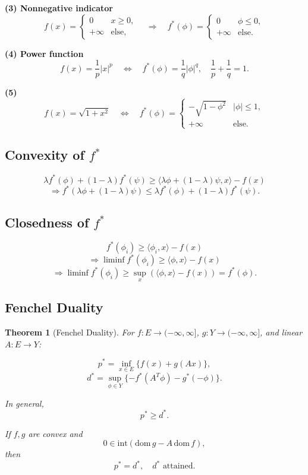 \documentclass[12pt,oneside]{book}
\numberwithin{equation}{section}
\theoremstyle{definition}
\theoremstyle{plain}
\newtheorem{theorem}{Theorem}[section]
\theoremstyle{remark}
\begin{document}
\textbf{(3) Nonnegative indicator}
\[
f(x) =
\begin{cases}
0 & x \ge 0,\\
+\infty & \text{else},
\end{cases}
\quad\Rightarrow\quad
f^*(\phi) =
\begin{cases}
0 & \phi \le 0,\\
+\infty & \text{else}.
\end{cases}
\]

\textbf{(4) Power function}
\[
f(x) = \frac{1}{p}|x|^p
\quad\Longleftrightarrow\quad
f^*(\phi) = \frac{1}{q}|\phi|^q,
\quad \frac{1}{p} + \frac{1}{q} = 1.
\]

\textbf{(5)}
\[
f(x) = \sqrt{1+x^2}
\quad\Longleftrightarrow\quad
f^*(\phi) =
\begin{cases}
-\sqrt{1-\phi^2} & |\phi| \le 1,\\
+\infty & \text{else}.
\end{cases}
\]

\subsection*{Convexity of $f^*$}

\[
\lambda f^*(\phi) + (1-\lambda) f^*(\psi)
\ge \langle \lambda \phi + (1-\lambda)\psi, x \rangle - f(x)
\]
\[
\Rightarrow
f^*(\lambda \phi + (1-\lambda)\psi)
\le \lambda f^*(\phi) + (1-\lambda) f^*(\psi).
\]

\subsection*{Closedness of $f^*$}

\[
f^*(\phi_i) \ge \langle \phi_i, x \rangle - f(x)
\]
\[
\Rightarrow
\liminf f^*(\phi_i) \ge \langle \phi, x \rangle - f(x)
\]
\[
\Rightarrow
\liminf f^*(\phi_i) \ge \sup_x (\langle \phi,x\rangle - f(x))
= f^*(\phi).
\]

\subsection*{Fenchel Duality}

\begin{theorem}[Fenchel Duality]
For $f:E\to(-\infty,\infty]$, $g:Y\to(-\infty,\infty]$, and linear $A:E\to Y$:

\[
p^* = \inf_{x\in E} \{f(x) + g(Ax)\},
\]
\[
d^* = \sup_{\phi\in Y} \{-f^*(A^T \phi) - g^*(-\phi)\}.
\]

In general,
\[
p^* \ge d^*.
\]

If $f,g$ are convex and
\[
0 \in \mathrm{int}(\mathrm{dom}\,g - A\,\mathrm{dom}\,f),
\]
then
\[
p^* = d^*,
\quad d^* \text{ attained.}
\]
\end{theorem}
\end{document}
